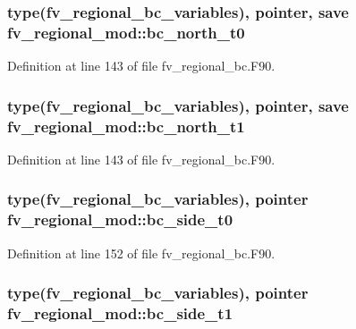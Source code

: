 \subsubsection[{bc\-\_\-north\-\_\-t0}]{\setlength{\rightskip}{0pt plus 5cm}type({\bf fv\-\_\-regional\-\_\-bc\-\_\-variables}), pointer, save fv\-\_\-regional\-\_\-mod\-::bc\-\_\-north\-\_\-t0\hspace{0.3cm}{\ttfamily [private]}}\label{classfv__regional__mod_a764cc29c643f325faec13145036f9777}


Definition at line 143 of file fv\-\_\-regional\-\_\-bc.\-F90.

\subsubsection[{bc\-\_\-north\-\_\-t1}]{\setlength{\rightskip}{0pt plus 5cm}type({\bf fv\-\_\-regional\-\_\-bc\-\_\-variables}), pointer, save fv\-\_\-regional\-\_\-mod\-::bc\-\_\-north\-\_\-t1\hspace{0.3cm}{\ttfamily [private]}}\label{classfv__regional__mod_a01fce45b2f3c2a2e3ba5005abb72670b}


Definition at line 143 of file fv\-\_\-regional\-\_\-bc.\-F90.

\subsubsection[{bc\-\_\-side\-\_\-t0}]{\setlength{\rightskip}{0pt plus 5cm}type({\bf fv\-\_\-regional\-\_\-bc\-\_\-variables}), pointer fv\-\_\-regional\-\_\-mod\-::bc\-\_\-side\-\_\-t0\hspace{0.3cm}{\ttfamily [private]}}\label{classfv__regional__mod_a152d9905d14d20d277c4fddf7a5fbc52}


Definition at line 152 of file fv\-\_\-regional\-\_\-bc.\-F90.

\subsubsection[{bc\-\_\-side\-\_\-t1}]{\setlength{\rightskip}{0pt plus 5cm}type({\bf fv\-\_\-regional\-\_\-bc\-\_\-variables}), pointer fv\-\_\-regional\-\_\-mod\-::bc\-\_\-side\-\_\-t1\hspace{0.3cm}{\ttfamily [private]}}\label{classfv__regional__mod_a8ffee600e05a0988addd6e7387fe9547}


